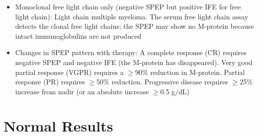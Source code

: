 \begin{itemize}
  \item Monoclonal free light chain only (negative SPEP but positive IFE for free light chain): Light chain multiple myeloma. The serum free light chain assay detects the clonal free light chains; the SPEP may show no M-protein because intact immunoglobulins are not produced
  \item Changes in SPEP pattern with therapy: A complete response (CR) requires negative SPEP and negative IFE (the M-protein has disappeared). Very good partial response (VGPR) requires a $\geq$90\% reduction in M-protein. Partial response (PR) requires $\geq$50\% reduction. Progressive disease requires $\geq$25\% increase from nadir (or an absolute increase $\geq$0.5 g/dL)
\end{itemize}

\section*{Normal Results}
